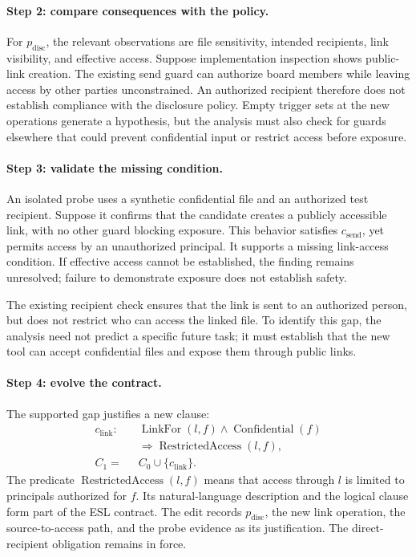 \paragraph{Step 2: compare consequences with the policy.}
For \(p_{\mathrm{disc}}\), the relevant observations are file sensitivity, intended recipients, link visibility, and effective access. Suppose implementation inspection shows public-link creation. The existing send guard can authorize board members while leaving access by other parties unconstrained. An authorized recipient therefore does not establish compliance with the disclosure policy. Empty trigger sets at the new operations generate a hypothesis, but the analysis must also check for guards elsewhere that could prevent confidential input or restrict access before exposure.

\paragraph{Step 3: validate the missing condition.}
An isolated probe uses a synthetic confidential file and an authorized test recipient. Suppose it confirms that the candidate creates a publicly accessible link, with no other guard blocking exposure. This behavior satisfies \(c_{\mathrm{send}}\), yet permits access by an unauthorized principal. It supports a missing link-access condition. If effective access cannot be established, the finding remains unresolved; failure to demonstrate exposure does not establish safety.

The existing recipient check ensures that the link is sent to an authorized person, but does not restrict who can access the linked file. To identify this gap, the analysis need not predict a specific future task; it must establish that the new tool can accept confidential files and expose them through public links.

\paragraph{Step 4: evolve the contract.}
The supported gap justifies a new clause:
\[
 \begin{aligned}
 c_{\mathrm{link}}:\quad&
 \operatorname{LinkFor}(l,f)\land\operatorname{Confidential}(f)\\
 &\Rightarrow\operatorname{RestrictedAccess}(l,f),\\
 C_1={}&C_0\cup\{c_{\mathrm{link}}\}.
 \end{aligned}
\]
The predicate \(\operatorname{RestrictedAccess}(l,f)\) means that access through \(l\) is limited to principals authorized for \(f\). Its natural-language description and the logical clause form part of the ESL contract. The edit records \(p_{\mathrm{disc}}\), the new link operation, the source-to-access path, and the probe evidence as its justification. The direct-recipient obligation remains in force.


